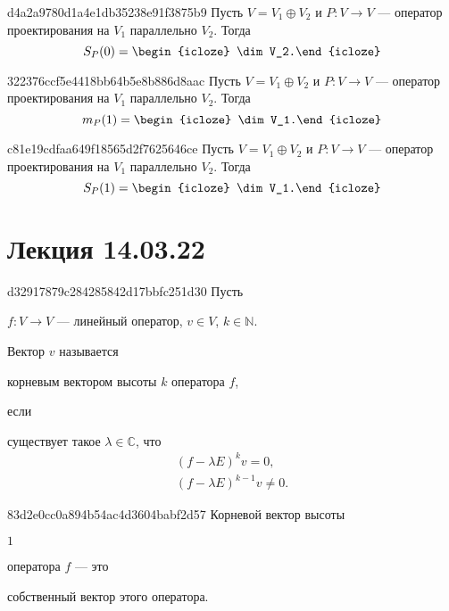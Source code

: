 \begin{note}{d4a2a9780d1a4e1db35238e91f3875b9}
    Пусть \( V = V_1 \oplus V_2 \) и \( P : V \to V \) --- оператор проектирования на \( V_1 \) параллельно \( V_2 \).
    Тогда
    \[
        S_P (0) = \begin{icloze}{1}\dim V_2.\end{icloze}
    \]
\end{note}

\begin{note}{322376ccf5e4418bb64b5e8b886d8aac}
    Пусть \( V = V_1 \oplus V_2 \) и \( P : V \to V \) --- оператор проектирования на \( V_1 \) параллельно \( V_2 \).
    Тогда
    \[
        m_P (1) = \begin{icloze}{1}\dim V_1.\end{icloze}
    \]
\end{note}

\begin{note}{c81e19cdfaa649f18565d2f7625646ce}
    Пусть \( V = V_1 \oplus V_2 \) и \( P : V \to V \) --- оператор проектирования на \( V_1 \) параллельно \( V_2 \).
    Тогда
    \[
        S_P (1) = \begin{icloze}{1}\dim V_1.\end{icloze}
    \]
\end{note}

\section{Лекция 14.03.22}
\begin{note}{d32917879c284285842d17bbfc251d30}
    Пусть \begin{icloze}{3}\( f : V \to V \) --- линейный оператор, \( v \in V \), \( k \in \mathbb N \).\end{icloze} Вектор \( v \) называется \begin{icloze}{2}корневым вектором высоты \( k \) оператора \( f \),\end{icloze} если \begin{icloze}{1}существует такое \( \lambda \in \mathbb C \), что
    \[
        \begin{gathered}
            (f - \lambda E)^{k} v = 0, \\
            (f - \lambda E)^{k - 1} v \neq 0.
        \end{gathered}
    \]\end{icloze}
\end{note}

\begin{note}{83d2e0cc0a894b54ac4d3604babf2d57}
    Корневой вектор высоты \begin{icloze}{2}\( 1 \)\end{icloze} оператора \( f \) --- это \begin{icloze}{1}собственный вектор этого оператора.\end{icloze}
\end{note}

